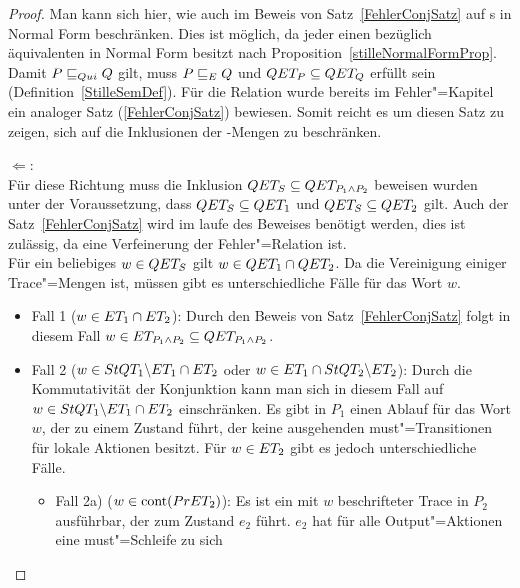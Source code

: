 \begin{proof}
  Man kann sich hier, wie auch im Beweis von Satz~\ref{FehlerConjSatz} auf
  \MEIO{}s in Normal Form beschränken. Dies ist möglich, da jeder \MEIO{} einen
  bezüglich \QRel{} äquivalenten \MEIO{} in Normal Form besitzt nach
  Proposition~\ref{stilleNormalFormProp}.\\
  Damit $P \sqsubseteq  _{Qui} Q$ gilt, muss $P \sqsubseteq  _E Q$ und $QET _P \subseteq QET _Q$
  erfüllt sein (Definition~\ref{StilleSemDef}). Für die Relation \ERel{} wurde
  bereits im Fehler"=Kapitel ein analoger Satz (\ref{FehlerConjSatz}) bewiesen.
  Somit reicht es um diesen Satz zu zeigen, sich auf die Inklusionen der
  \QET{}-Mengen zu beschränken.


  \glqq $\Leftarrow$\grqq{}:\\
  Für diese Richtung muss die Inklusion $QET _S\subseteq QET _{P_1\land P_2}$
  beweisen wurden unter der Voraussetzung, dass $QET _S\subseteq QET _1$ und
  $QET _S\subseteq QET _2$ gilt. Auch der Satz~\ref{FehlerConjSatz} wird im
  laufe des Beweises benötigt werden, dies ist zulässig, da \QRel{} eine
  Verfeinerung der Fehler"=Relation \ERel{} ist.\\
  Für ein beliebiges $w\in QET _S$ gilt $w\in QET _1\cap QET _2$. Da \QET{}
  die Vereinigung einiger Trace"=Mengen ist, müssen gibt es unterschiedliche
  Fälle für das Wort $w$.
  \begin{itemize}
    \item Fall 1 ($w\in ET _1\cap ET _2$): Durch den Beweis von
      Satz~\ref{FehlerConjSatz} folgt in diesem Fall $w\in ET _{P_1\land P_2}
      \subseteq QET _{P_1\land P_2}$.
    \item Fall 2 ($w\in StQT _1\backslash ET _1\cap ET _2$ oder $w\in ET _1
      \cap StQT _2\backslash ET _2$): Durch die Kommutativität der Konjunktion
      kann man sich in diesem Fall \oBdA{} auf $w\in StQT _1\backslash ET
      _1\cap ET _2$ einschränken. Es gibt in $P_1$ einen Ablauf für das Wort
      $w$, der zu einem Zustand führt, der keine ausgehenden must"=Transitionen
      für lokale Aktionen besitzt. Für $w\in ET _2$ gibt es jedoch
      unterschiedliche Fälle.
      \\ 
      \begin{itemize}
        \item Fall 2a) ($w\in\mathrm{cont} (PrET _2)$): Es ist ein mit $w$
          beschrifteter Trace in $P_2$ ausführbar, der zum Zustand $e_2$ führt.
          $e_2$ hat für alle Output"=Aktionen eine must"=Schleife zu sich

\end{itemize}
\end{itemize}
\end{proof}
